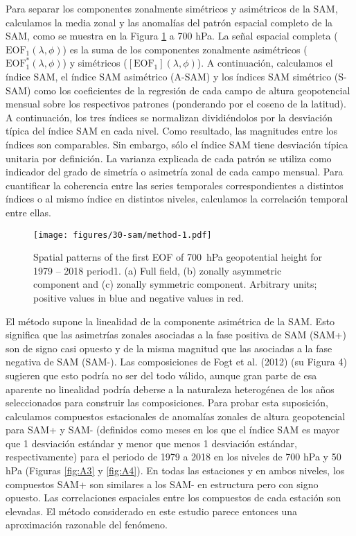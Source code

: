 \documentclass[12pt,oneside]{reedthesis}
\begin{document}
Para separar los componentes zonalmente simétricos y asimétricos de la SAM, calculamos la media zonal y las anomalías del patrón espacial completo de la SAM, como se muestra en la Figura \ref{fig:method} a 700 hPa.
La señal espacial completa (\(\mathrm{EOF_1}(\lambda, \phi)\)) es la suma de los componentes zonalmente asimétricos (\(\mathrm{EOF_1^*}(\lambda, \phi)\)) y simétricos (\([\mathrm{EOF_1}](\lambda, \phi)\)).
A continuación, calculamos el índice SAM, el índice SAM asimétrico (A\nobreakdash-SAM) y los índices SAM simétrico (S\nobreakdash-SAM) como los coeficientes de la regresión de cada campo de altura geopotencial mensual sobre los respectivos patrones (ponderando por el coseno de la latitud).
A continuación, los tres índices se normalizan dividiéndolos por la desviación típica del índice SAM en cada nivel.
Como resultado, las magnitudes entre los índices son comparables.
Sin embargo, sólo el índice SAM tiene desviación típica unitaria por definición.
La varianza explicada de cada patrón se utiliza como indicador del grado de simetría o asimetría zonal de cada campo mensual.
Para cuantificar la coherencia entre las series temporales correspondientes a distintos índices o al mismo índice en distintos niveles, calculamos la correlación temporal entre ellas.


\begin{figure}
\centering
\texttt{[image: figures/30-sam/method-1.pdf]}
\caption{\label{fig:method}Spatial patterns of the first EOF of 700~hPa geopotential height for 1979 -- 2018 period1. (a) Full field, (b) zonally asymmetric component and (c) zonally symmetric component. Arbitrary units; positive values in blue and negative values in red.}
\end{figure}
El método supone la linealidad de la componente asimétrica de la SAM.
Esto significa que las asimetrías zonales asociadas a la fase positiva de SAM (SAM+) son de signo casi opuesto y de la misma magnitud que las asociadas a la fase negativa de SAM (SAM-).
Las composiciones de Fogt et al. (2012) (su Figura 4) sugieren que esto podría no ser del todo válido, aunque gran parte de esa aparente no linealidad podría deberse a la naturaleza heterogénea de los años seleccionados para construir las composiciones.
Para probar esta suposición, calculamos compuestos estacionales de anomalías zonales de altura geopotencial para SAM+ y SAM- (definidos como meses en los que el índice SAM es mayor que 1 desviación estándar y menor que menos 1 desviación estándar, respectivamente) para el periodo de 1979 a 2018 en los niveles de 700 hPa y 50 hPa (Figuras \ref{fig:A3} y \ref{fig:A4}).
En todas las estaciones y en ambos niveles, los compuestos SAM+ son similares a los SAM- en estructura pero con signo opuesto.
Las correlaciones espaciales entre los compuestos de cada estación son elevadas.
El método considerado en este estudio parece entonces una aproximación razonable del fenómeno.
\end{document}
